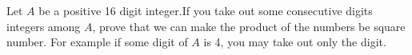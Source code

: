 Let $ A$ be a positive 16 digit integer.If you take out some consecutive digits integers among $ A$, prove that we can make the product of the numbers be square number. For example if some digit of $ A$ is 4, you may take out only the digit.